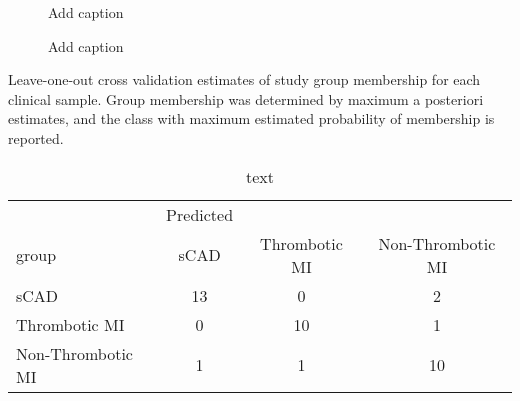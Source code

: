 \begin{figure}[H]
	\caption[Add caption]{Add caption \label{fig:ptid2010MCMC} }
\end{figure}

\begin{figure}[H]
	\caption[Add caption]{Add caption \label{fig:ptid2010Hist} }
\end{figure}
 
Leave-one-out cross validation estimates of study group membership for each clinical sample. Group membership was determined by maximum a posteriori estimates, and the class with maximum estimated probability of membership is reported.
 
 \begin{table}[H]
 	\caption{text}
 	\label{tab:modelRes}
 	\centering
 	\begin{tabular}{l|ccc}
 		& Predicted & & \\
 		group  &     sCAD & Thrombotic MI & Non-Thrombotic MI \\
 		\hline
 		sCAD   &     13    &     0    &     2\\
 		Thrombotic MI  &  0    &    10    &     1\\
 		Non-Thrombotic MI &   1    &     1   &     10
 	\end{tabular}
 \end{table}